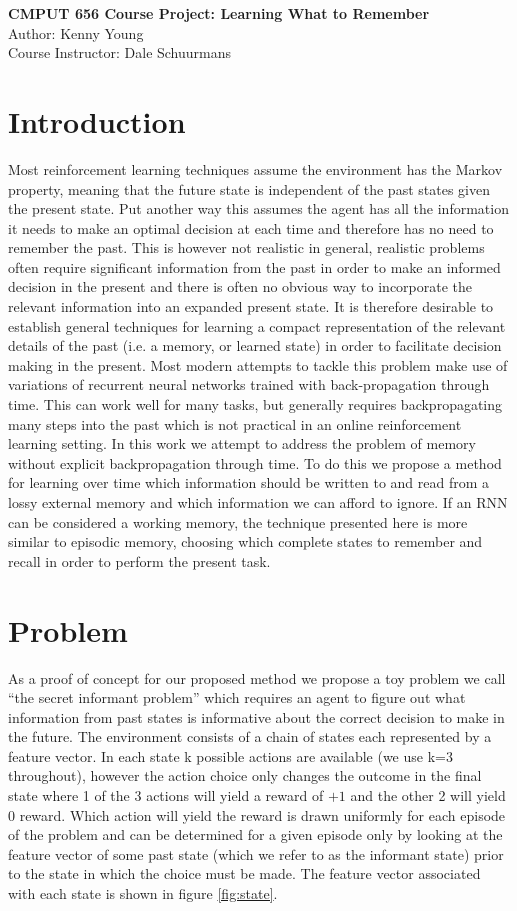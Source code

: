 \documentclass{article}
\begin{document}
\begin{center}
{\Large \textbf{CMPUT 656 Course Project: Learning What to Remember}}\\
{Author: Kenny Young}\\
{Course Instructor:  Dale Schuurmans}\\
\end{center}
\section*{Introduction}
Most reinforcement learning techniques assume the environment has the Markov property, meaning that the future state is independent of the past states given the present state. Put another way this assumes the agent has all the information it needs to make an optimal decision at each time and therefore has no need to remember the past. This is however not realistic in general, realistic problems often require significant information from the past in order to make an informed decision in the present and there is often no obvious way to incorporate the relevant information into an expanded present state. It is therefore desirable to establish general techniques for learning a compact representation of the relevant details of the past (i.e. a memory, or learned state) in order to facilitate decision making in the present.
Most modern attempts to tackle this problem make use of variations of recurrent neural networks trained with back-propagation through time. This can work well for many tasks, but generally requires backpropagating many steps into the past which is not practical in an online reinforcement learning setting. In this work we attempt to address the problem of memory without explicit backpropagation through time. To do this we propose a method for learning over time which information should be written to and read from a lossy external memory and which information we can afford to ignore. If an RNN can be considered a working memory, the technique presented here is more similar to episodic memory, choosing which complete states to remember and recall in order to perform the present task.

\section*{Problem}
As a proof of concept for our proposed method we propose a toy problem we call ``the secret informant problem'' which requires an agent to figure out what information from past states is informative about the correct decision to make in the future. The environment consists of a chain of states each represented by a feature vector. In each state k possible actions are available (we use k=3 throughout), however the action choice only changes the outcome in the final state where 1 of the 3 actions will yield a reward of $+1$ and the other 2 will yield $0$ reward. Which action will yield the reward is drawn uniformly for each episode of the problem and can be determined for a given episode only by looking at the feature vector of some past state (which we refer to as the informant state) prior to the state in which the choice must be made. The feature vector associated with each state is shown in figure \ref{fig:state}.
\end{document}
